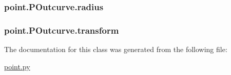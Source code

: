 \subsubsection[{radius}]{\setlength{\rightskip}{0pt plus 5cm}point.\+P\+Outcurve.\+radius}\label{classpoint_1_1_p_outcurve_ab3da10b0f1738c4ba0ed1e8000bd1c13}
\hypertarget{classpoint_1_1_p_outcurve_af0f9106c1983ccfd7d513d9475d83e76}{}
\subsubsection[{transform}]{\setlength{\rightskip}{0pt plus 5cm}point.\+P\+Outcurve.\+transform}\label{classpoint_1_1_p_outcurve_af0f9106c1983ccfd7d513d9475d83e76}


The documentation for this class was generated from the following file\+:\begin{DoxyCompactItemize}
\item 
\hyperlink{point_8py}{point.\+py}\end{DoxyCompactItemize}
